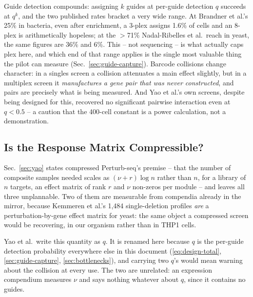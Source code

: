  Guide detection compounds:
assigning $k$ guides at per-guide detection $q$ succeeds at $q^{k}$, and the two
published rates bracket a very wide range. At Brandner et al.'s 25\% in bacteria,
even after enrichment, a 3-plex assigns 1.6\% of cells and an 8-plex is
arithmetically hopeless; at the $>$71\% Nadal-Ribelles et al.\ reach in yeast, the
same figures are 36\% and 6\%. This -- not sequencing -- is what actually caps
plex here, and which end of that range applies is the single most valuable thing
the pilot can measure (Sec.~\ref{sec:guide-capture}). Barcode collisions change
character: in a singles screen a collision attenuates a main effect slightly, but in
a multiplex screen it \emph{manufactures a gene pair that was never constructed},
and pairs are precisely what is being measured. And Yao et al.'s own screens, despite
being designed for this, recovered no significant pairwise interaction even at
$q<0.5$ -- a caution that the 400-cell constant is a power calculation, not a
demonstration.

\subsection{Is the Response Matrix Compressible?}
\label{sec:compression}

Sec.~\ref{sec:yao} states compressed Perturb-seq's premise -- that the number of
composite samples needed scales as $(\nu+r)\log n$ rather than $n$, for a library
of $n$ targets, an effect matrix of rank $r$ and $\nu$ non-zeros per module --
and leaves all three unplannable. Two of them are measurable from compendia
already in the mirror, because Kemmeren et al.'s 1{,}484 single-deletion profiles
\emph{are} a perturbation-by-gene effect matrix for yeast: the same object a
compressed screen would be recovering, in our organism rather than in THP1 cells.

 Yao et al.\ write this quantity as $q$. It is renamed
here because $q$ is the per-guide detection probability everywhere else in this
document (\cref{eq:design-total}, \cref{sec:guide-capture},
\cref{sec:bottlenecks}), and carrying two $q$'s would mean warning about the
collision at every use. The two are unrelated: an expression compendium measures
$\nu$ and says nothing whatever about $q$, since it contains no guides.



